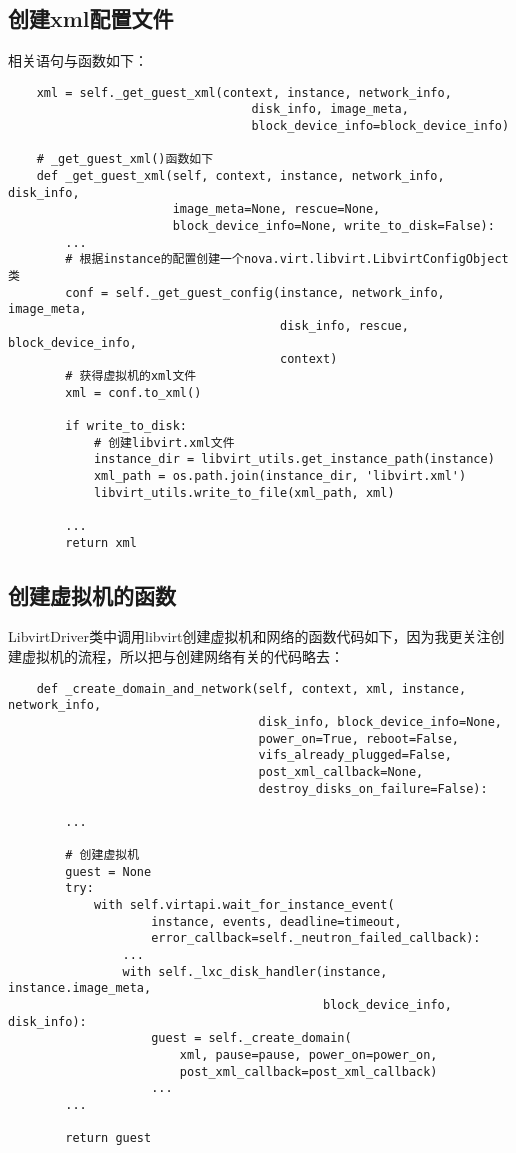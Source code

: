 \documentclass[a4paper,left=1.5cm,right=1.5cm,11pt]{article}
\begin{document}
\subsection{创建xml配置文件}
	相关语句与函数如下：
	\begin{lstlisting}
	xml = self._get_guest_xml(context, instance, network_info,
                                  disk_info, image_meta,
                                  block_device_info=block_device_info)
	
	# _get_guest_xml()函数如下
	def _get_guest_xml(self, context, instance, network_info, disk_info,
                       image_meta=None, rescue=None,
                       block_device_info=None, write_to_disk=False):
        ...
		# 根据instance的配置创建一个nova.virt.libvirt.LibvirtConfigObject类
        conf = self._get_guest_config(instance, network_info, image_meta,
                                      disk_info, rescue, block_device_info,
                                      context)
		# 获得虚拟机的xml文件
        xml = conf.to_xml()

        if write_to_disk:
			# 创建libvirt.xml文件
            instance_dir = libvirt_utils.get_instance_path(instance)
            xml_path = os.path.join(instance_dir, 'libvirt.xml')
            libvirt_utils.write_to_file(xml_path, xml)

        ...
        return xml
	\end{lstlisting}

\subsection{创建虚拟机的函数}
	LibvirtDriver类中调用libvirt创建虚拟机和网络的函数代码如下，因为我更关注创建虚拟机的流程，所以把与创建网络有关的代码略去：
	\begin{lstlisting}
	def _create_domain_and_network(self, context, xml, instance, network_info,
                                   disk_info, block_device_info=None,
                                   power_on=True, reboot=False,
                                   vifs_already_plugged=False,
                                   post_xml_callback=None,
                                   destroy_disks_on_failure=False):

        ...

		# 创建虚拟机
        guest = None
        try:
            with self.virtapi.wait_for_instance_event(
                    instance, events, deadline=timeout,
                    error_callback=self._neutron_failed_callback):
                ...
                with self._lxc_disk_handler(instance, instance.image_meta,
                                            block_device_info, disk_info):
                    guest = self._create_domain(
                        xml, pause=pause, power_on=power_on,
                        post_xml_callback=post_xml_callback)
					...
        ...

        return guest
	\end{lstlisting}
\end{document}
